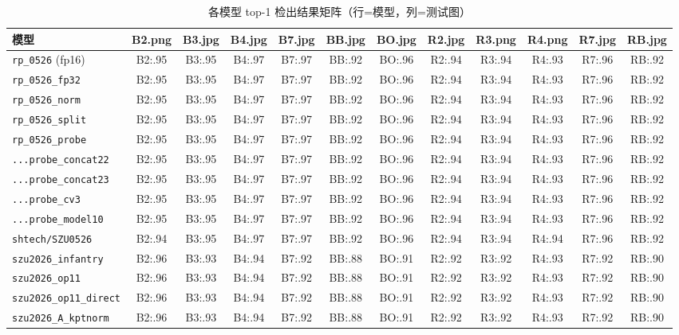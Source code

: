 \documentclass[11pt,a4paper]{ctexart}
\newcommand{\code}[1]{\texttt{\small #1}}
\begin{document}
\begin{table}[htbp]
\centering\tiny
\caption{各模型 top-1 检出结果矩阵（行=模型，列=测试图）}\label{tab:det}
\setlength{\tabcolsep}{2pt}
\begin{tabular}{@{}l*{11}{c}@{}}
\toprule
模型 & B2.png & B3.jpg & B4.jpg & B7.jpg & BB.jpg & BO.jpg & R2.jpg & R3.png & R4.png & R7.jpg & RB.jpg\\
\midrule
\code{rp\_0526} (fp16) & B2:.95 & B3:.95 & B4:.97 & B7:.97 & BB:.92 & BO:.96 & R2:.94 & R3:.94 & R4:.93 & R7:.96 & RB:.92\\
\code{rp\_0526\_fp32} & B2:.95 & B3:.95 & B4:.97 & B7:.97 & BB:.92 & BO:.96 & R2:.94 & R3:.94 & R4:.93 & R7:.96 & RB:.92\\
\code{rp\_0526\_norm} & B2:.95 & B3:.95 & B4:.97 & B7:.97 & BB:.92 & BO:.96 & R2:.94 & R3:.94 & R4:.93 & R7:.96 & RB:.92\\
\code{rp\_0526\_split} & B2:.95 & B3:.95 & B4:.97 & B7:.97 & BB:.92 & BO:.96 & R2:.94 & R3:.94 & R4:.93 & R7:.96 & RB:.92\\
\code{rp\_0526\_probe} & B2:.95 & B3:.95 & B4:.97 & B7:.97 & BB:.92 & BO:.96 & R2:.94 & R3:.94 & R4:.93 & R7:.96 & RB:.92\\
\code{...probe\_concat22} & B2:.95 & B3:.95 & B4:.97 & B7:.97 & BB:.92 & BO:.96 & R2:.94 & R3:.94 & R4:.93 & R7:.96 & RB:.92\\
\code{...probe\_concat23} & B2:.95 & B3:.95 & B4:.97 & B7:.97 & BB:.92 & BO:.96 & R2:.94 & R3:.94 & R4:.93 & R7:.96 & RB:.92\\
\code{...probe\_cv3} & B2:.95 & B3:.95 & B4:.97 & B7:.97 & BB:.92 & BO:.96 & R2:.94 & R3:.94 & R4:.93 & R7:.96 & RB:.92\\
\code{...probe\_model10} & B2:.95 & B3:.95 & B4:.97 & B7:.97 & BB:.92 & BO:.96 & R2:.94 & R3:.94 & R4:.93 & R7:.96 & RB:.92\\
\code{shtech/SZU0526} & B2:.94 & B3:.95 & B4:.97 & B7:.97 & BB:.92 & BO:.96 & R2:.94 & R3:.94 & R4:.94 & R7:.96 & RB:.92\\
\code{szu2026\_infantry} & B2:.96 & B3:.93 & B4:.94 & B7:.92 & BB:.88 & BO:.91 & R2:.92 & R3:.92 & R4:.93 & R7:.92 & RB:.90\\
\code{szu2026\_op11} & B2:.96 & B3:.93 & B4:.94 & B7:.92 & BB:.88 & BO:.91 & R2:.92 & R3:.92 & R4:.93 & R7:.92 & RB:.90\\
\code{szu2026\_op11\_direct} & B2:.96 & B3:.93 & B4:.94 & B7:.92 & BB:.88 & BO:.91 & R2:.92 & R3:.92 & R4:.93 & R7:.92 & RB:.90\\
\code{szu2026\_A\_kptnorm} & B2:.96 & B3:.93 & B4:.94 & B7:.92 & BB:.88 & BO:.91 & R2:.92 & R3:.92 & R4:.93 & R7:.92 & RB:.90\\

\end{tabular}
\end{table}
\end{document}
